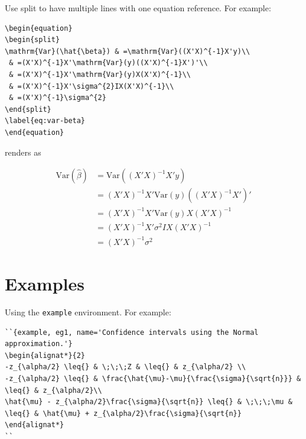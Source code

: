 \documentclass[
]{book}
\theoremstyle{definition}
\theoremstyle{definition}
\theoremstyle{definition}
\theoremstyle{remark}
\begin{document}
Use split to have multiple lines with one equation reference. For example:

\begin{verbatim}
\begin{equation} 
\begin{split}
\mathrm{Var}(\hat{\beta}) & =\mathrm{Var}((X'X)^{-1}X'y)\\
 & =(X'X)^{-1}X'\mathrm{Var}(y)((X'X)^{-1}X')'\\
 & =(X'X)^{-1}X'\mathrm{Var}(y)X(X'X)^{-1}\\
 & =(X'X)^{-1}X'\sigma^{2}IX(X'X)^{-1}\\
 & =(X'X)^{-1}\sigma^{2}
\end{split}
\label{eq:var-beta}
\end{equation} 
\end{verbatim}

renders as

\begin{equation} 
\begin{split}
\mathrm{Var}(\hat{\beta}) & =\mathrm{Var}((X'X)^{-1}X'y)\\
 & =(X'X)^{-1}X'\mathrm{Var}(y)((X'X)^{-1}X')'\\
 & =(X'X)^{-1}X'\mathrm{Var}(y)X(X'X)^{-1}\\
 & =(X'X)^{-1}X'\sigma^{2}IX(X'X)^{-1}\\
 & =(X'X)^{-1}\sigma^{2}
\end{split}
\label{eq:var-beta}
\end{equation}

\hypertarget{examples}{%
\section{Examples}\label{examples}}

Using the \texttt{example} environment. For example: 

\begin{verbatim}
``{example, eg1, name='Confidence intervals using the Normal approximation.'}
\begin{alignat*}{2}
-z_{\alpha/2} \leq{} & \;\;\;Z & \leq{} & z_{\alpha/2} \\
-z_{\alpha/2} \leq{} & \frac{\hat{\mu}-\mu}{\frac{\sigma}{\sqrt{n}}} & \leq{} & z_{\alpha/2}\\
\hat{\mu} - z_{\alpha/2}\frac{\sigma}{\sqrt{n}} \leq{} & \;\;\;\mu & \leq{} & \hat{\mu} + z_{\alpha/2}\frac{\sigma}{\sqrt{n}}
\end{alignat*}
``
\end{verbatim}
\end{document}

